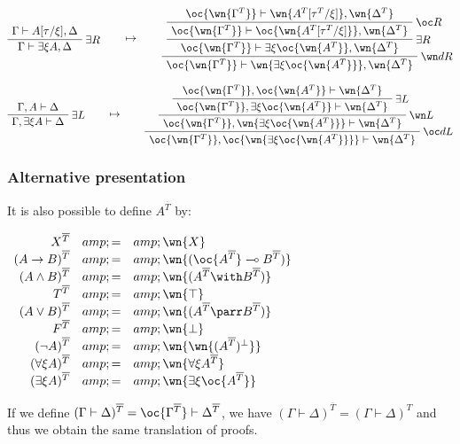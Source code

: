 \(\AxRule{\Gamma\vdash A[\tau/\xi],\Delta}
\LabelRule{\exists R}
\UnaRule{\Gamma\vdash \exists\xi A,\Delta}
\DisplayProof
\qquad\mapsto\qquad
\AxRule{\oc{\wn{\Gamma^T}}\vdash \wn{A^T[\tau^T/\xi]},\wn{\Delta^T}}
\LabelRule{\oc R}
\UnaRule{\oc{\wn{\Gamma^T}}\vdash \oc{\wn{A^T[\tau^T/\xi]}},\wn{\Delta^T}}
\LabelRule{\exists R}
\UnaRule{\oc{\wn{\Gamma^T}}\vdash \exists\xi \oc{\wn{A^T}},\wn{\Delta^T}}
\LabelRule{\wn d R}
\UnaRule{\oc{\wn{\Gamma^T}}\vdash \wn{\exists\xi \oc{\wn{A^T}}},\wn{\Delta^T}}
\DisplayProof\)

\(\AxRule{\Gamma,A\vdash \Delta}
\LabelRule{\exists L}
\UnaRule{\Gamma,\exists\xi A\vdash \Delta}
\DisplayProof
\qquad\mapsto\qquad
\AxRule{\oc{\wn{\Gamma^T}},\oc{\wn{A^T}}\vdash \wn{\Delta^T}}
\LabelRule{\exists L}
\UnaRule{\oc{\wn{\Gamma^T}},\exists\xi\oc{\wn{A^T}}\vdash \wn{\Delta^T}}
\LabelRule{\wn L}
\UnaRule{\oc{\wn{\Gamma^T}},\wn{\exists\xi\oc{\wn{A^T}}}\vdash \wn{\Delta^T}}
\LabelRule{\oc d L}
\UnaRule{\oc{\wn{\Gamma^T}},\oc{\wn{\exists\xi\oc{\wn{A^T}}}}\vdash \wn{\Delta^T}}
\DisplayProof\)

\subsubsection{Alternative presentation}\label{alternative-presentation}

It is also possible to define \(A^{\overline{T}}\) by:

\(\begin{array}{rcl}
X^{\overline{T}} &amp; = &amp; \wn{X} \\
(A\imp B)^{\overline{T}} &amp; = &amp; \wn{(\oc{A^{\overline{T}}}\limp B^{\overline{T}})} \\
(A\wedge B)^{\overline{T}} &amp; = &amp; \wn{(A^{\overline{T}} \with B^{\overline{T}})} \\
T^{\overline{T}} &amp; = &amp; \wn{\top} \\
(A\vee B)^{\overline{T}} &amp; = &amp; \wn{(A^{\overline{T}}\parr B^{\overline{T}})} \\
F^{\overline{T}} &amp; = &amp; \wn{\bot} \\
(\neg A)^{\overline{T}} &amp; = &amp; \wn{\wn{(A^{\overline{T}})\orth}} \\
(\forall\xi A)^{\overline{T}} &amp; = &amp; \wn{\forall\xi A^{\overline{T}}} \\
(\exists\xi A)^{\overline{T}} &amp; = &amp; \wn{\exists\xi \oc{A^{\overline{T}}}}
\end{array}\)

If we define
\((\Gamma\vdash\Delta)^{\overline{T}} = \oc{\Gamma^{\overline{T}}}\vdash \Delta^{\overline{T}}\),
we have \((\Gamma\vdash\Delta)^{\overline{T}} = (\Gamma\vdash\Delta)^T\)
and thus we obtain the same translation of proofs.

